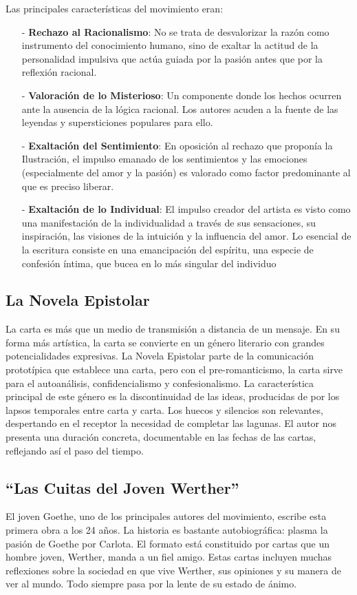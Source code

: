 \documentclass{article}
\begin{document}
Las principales características del movimiento eran:
\begin{itemize}
    \item[-] \textbf{Rechazo al Racionalismo}: No se trata de desvalorizar la razón como instrumento del conocimiento humano, sino de exaltar la actitud de la personalidad impulsiva que actúa guiada por la pasión antes que por la reflexión racional.
    \item[-] \textbf{Valoración de lo Misterioso}: Un componente donde los hechos ocurren ante la ausencia de la lógica racional. Los autores acuden a la fuente de las leyendas y supersticiones populares para ello.
    \item[-] \textbf{Exaltación del Sentimiento}: En oposición al
    rechazo que proponía la Ilustración, el impulso emanado de los sentimientos y las emociones (especialmente del amor y la pasión) es valorado como factor predominante al que es preciso liberar.
    \item[-]  \textbf{Exaltación de lo Individual}: El impulso creador del artista es visto como una manifestación de la individualidad a través de sus sensaciones, su inspiración, las visiones de la intuición y la influencia del amor. Lo esencial de la escritura consiste en una emancipación del espíritu, una especie de confesión íntima, que bucea en lo más singular del individuo
\end{itemize}

\subsection{La Novela Epistolar}

La carta es más que un medio de transmisión a distancia de un mensaje. En su forma más artística, la carta se convierte en un género literario con grandes potencialidades expresivas. La Novela Epistolar parte de la comunicación prototípica que establece una carta, pero con el pre-romanticismo, la carta sirve para el autoanálisis, confidencialismo y confesionalismo. La característica principal de este género es la discontinuidad de las ideas, producidas de por los lapsos temporales entre carta y carta. Los huecos y silencios son relevantes, despertando en el receptor la necesidad de completar las lagunas. El autor nos presenta una duración concreta, documentable en las fechas de las cartas, reflejando así el paso del tiempo.

\subsection{``Las Cuitas del Joven Werther''}

El joven Goethe, uno de los principales autores del movimiento, escribe esta primera obra a los 24 años. La historia es bastante autobiográfica: plasma la pasión de Goethe por Carlota. El formato está constituido por cartas que un hombre joven, Werther, manda a un fiel amigo. Estas cartas incluyen muchas reflexiones sobre la sociedad en que vive Werther, sus opiniones y su manera de ver al mundo. Todo siempre pasa por la lente de su
estado de ánimo.
\end{document}
